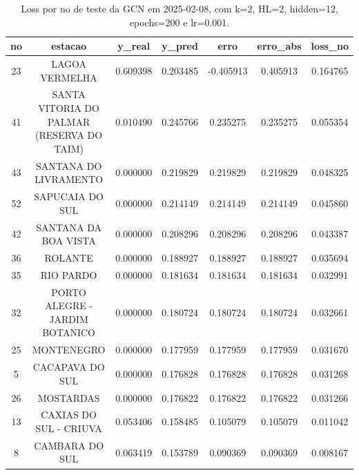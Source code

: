 \begin{table}[h]
\centering
\caption{Loss por no de teste da GCN em 2025-02-08, com k=2, HL=2, hidden=12, epochs=200 e lr=0.001.}
\label{tab:gcn_loss_k2_hl2_h12_e200_d20250208}
\begin{tabular}{ccccccc}
\toprule
no & estacao & y\_real & y\_pred & erro & erro\_abs & loss\_no \\
\midrule
23 & LAGOA VERMELHA & 0.609398 & 0.203485 & -0.405913 & 0.405913 & 0.164765 \\
41 & SANTA VITORIA DO PALMAR (RESERVA DO TAIM) & 0.010490 & 0.245766 & 0.235275 & 0.235275 & 0.055354 \\
43 & SANTANA DO LIVRAMENTO & 0.000000 & 0.219829 & 0.219829 & 0.219829 & 0.048325 \\
52 & SAPUCAIA DO SUL & 0.000000 & 0.214149 & 0.214149 & 0.214149 & 0.045860 \\
42 & SANTANA DA BOA VISTA & 0.000000 & 0.208296 & 0.208296 & 0.208296 & 0.043387 \\
36 & ROLANTE & 0.000000 & 0.188927 & 0.188927 & 0.188927 & 0.035694 \\
35 & RIO PARDO & 0.000000 & 0.181634 & 0.181634 & 0.181634 & 0.032991 \\
32 & PORTO ALEGRE - JARDIM BOTANICO & 0.000000 & 0.180724 & 0.180724 & 0.180724 & 0.032661 \\
25 & MONTENEGRO & 0.000000 & 0.177959 & 0.177959 & 0.177959 & 0.031670 \\
5 & CACAPAVA DO SUL & 0.000000 & 0.176828 & 0.176828 & 0.176828 & 0.031268 \\
26 & MOSTARDAS & 0.000000 & 0.176822 & 0.176822 & 0.176822 & 0.031266 \\
13 & CAXIAS DO SUL - CRIUVA & 0.053406 & 0.158485 & 0.105079 & 0.105079 & 0.011042 \\
8 & CAMBARA DO SUL & 0.063419 & 0.153789 & 0.090369 & 0.090369 & 0.008167 \\
\bottomrule
\end{tabular}
\end{table}
